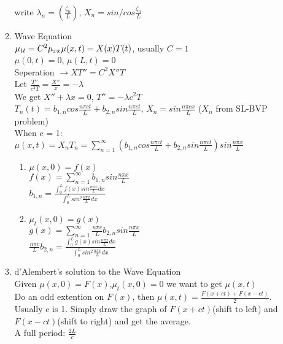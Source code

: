 \documentclass[10pt]{article}
\begin{document}
\begin{multicols}{2}
\begin{enumerate}
\begin{enumerate}
				write $\lambda_n = (\frac{\zeta_n}{L})$, $X_n = sin/cos \frac{\zeta_n}{L}$
			\item Wave Equation\\
				$\mu_{tt} = C^2\mu_{xx}\\
				\mu(x,t) = X(x)T(t)$, usually $C = 1$\\
				$\mu (0,t) = 0$, $\mu (L,t)=0$\\
			 	Seperation $\rightarrow XT'' = C^2X''T$\\
				Let $\frac{T''}{c^2T} = \frac{X''}{x} = -\lambda$\\
				We get $X'' + \lambda x = 0$, $T'' =  -\lambda c^2T$\\
				$T_n(t) = b_{1,n}cos\frac{n\pi ct}{L} + b_{2,n}sin\frac{n\pi ct}{L}$, $X_n = sin\frac{n\pi cx}{L}$ ($X_n$ from SL-BVP problem)\\
				When c = 1:\\
				$\mu (x,t) = X_nT_n = \sum_{n = 1}^{\infty}(b_{1,n}cos\frac{n\pi ct}{L} + b_{2,n}sin\frac{n\pi c t}{L})sin\frac{n\pi x}{L}$
				\begin{enumerate}
					\item $\mu(x,0) = f(x)$\\
					$f(x) = \sum_{n = 1}^{\infty}b_{1,n}sin\frac{n\pi x}{L}$\\
					$b_{1,n} = \frac{\int_{0}^{L}f(x)sin\frac{n\pi x}{L}dx}{\int_{0}^{L}sin^2\frac{n\pi x}{L}dx}$\\
					\item $\mu_t(x,0) = g(x)$\\
					$g(x) = \sum_{n = 1}^{\infty} \frac{n\pi c}{L}b_{2,n}sin\frac{n\pi x}{L}$\\
					$\frac{n\pi c}{L}b_{2,n} = \frac{\int_{0}^{L}g(x)sin\frac{n\pi x}{L}dx}{\int_{0}^{L}sin^2\frac{n\pi x}{L}dx}$
				\end{enumerate}
			\item d'Alembert's solution to the Wave Equation\\
				Given $\mu (x,0) = F(x)$,$\mu_t (x,0) = 0$ we want to get $\mu(x,t)$\\
				Do an odd extention on $F(x)$, then $\mu(x,t) = \frac{F(x+ct) + F(x-ct)}{2}$. Usually c is 1. Simply draw the graph of $F(x+ct)$(shift to left) and $F(x-ct)$(shift to right) and get the average.\\
				A full period: $\frac{2L}{c}$
	    \end{enumerate}
    

\end{enumerate}
\end{multicols}
\end{document}

